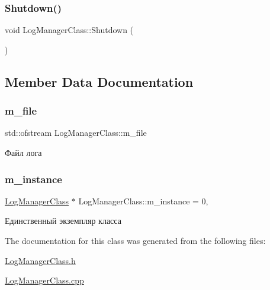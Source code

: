 \subsubsection{\texorpdfstring{Shutdown()}{Shutdown()}}
{\footnotesize\ttfamily void Log\+Manager\+Class\+::\+Shutdown (\begin{DoxyParamCaption}{ }\end{DoxyParamCaption})}



\subsection{Member Data Documentation}
\mbox{\label{class_log_manager_class_ab2d1af381633456d999dc9ad2801c9f7}} 
\subsubsection{\texorpdfstring{m\+\_\+file}{m\_file}}
{\footnotesize\ttfamily std\+::ofstream Log\+Manager\+Class\+::m\+\_\+file\hspace{0.3cm}{\ttfamily [private]}}



Файл лога 

\mbox{\label{class_log_manager_class_a00d2649a15e89917cf53ced070fb40db}} 
\subsubsection{\texorpdfstring{m\+\_\+instance}{m\_instance}}
{\footnotesize\ttfamily \hyperlink{class_log_manager_class}{Log\+Manager\+Class} $\ast$ Log\+Manager\+Class\+::m\+\_\+instance = 0\hspace{0.3cm}{\ttfamily [static]}, {\ttfamily [private]}}



Единственный экземпляр класса 



The documentation for this class was generated from the following files\+:\begin{DoxyCompactItemize}
\item 
\hyperlink{_log_manager_class_8h}{Log\+Manager\+Class.\+h}\item 
\hyperlink{_log_manager_class_8cpp}{Log\+Manager\+Class.\+cpp}\end{DoxyCompactItemize}
